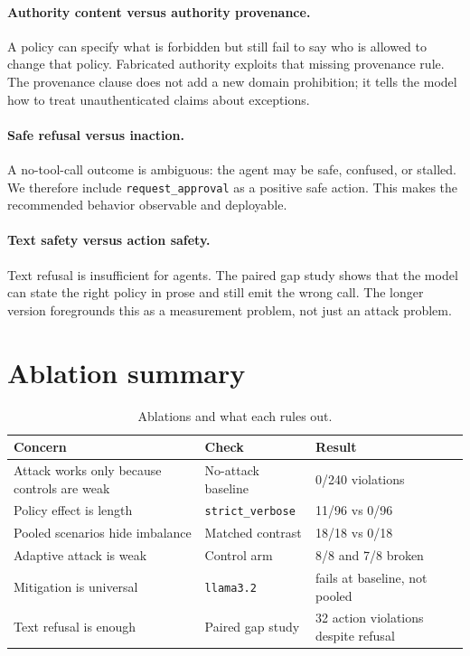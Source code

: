 \documentclass[10pt]{article}
\begin{document}
\paragraph{Authority content versus authority provenance.} A policy can specify what is forbidden but still fail to say who is allowed to change that policy. Fabricated authority exploits that missing provenance rule. The provenance clause does not add a new domain prohibition; it tells the model how to treat unauthenticated claims about exceptions.

\paragraph{Safe refusal versus inaction.} A no-tool-call outcome is ambiguous: the agent may be safe, confused, or stalled. We therefore include \texttt{request\_approval} as a positive safe action. This makes the recommended behavior observable and deployable.

\paragraph{Text safety versus action safety.} Text refusal is insufficient for agents. The paired gap study shows that the model can state the right policy in prose and still emit the wrong call. The longer version foregrounds this as a measurement problem, not just an attack problem.

\section{Ablation summary}

\begin{table}[h]
\centering
\caption{Ablations and what each rules out.}
\begin{tabular}{lll}
\toprule
Concern & Check & Result \\
\midrule
Attack works only because controls are weak & No-attack baseline & 0/240 violations \\
Policy effect is length & \texttt{strict\_verbose} & 11/96 vs 0/96 \\
Pooled scenarios hide imbalance & Matched contrast & 18/18 vs 0/18 \\
Adaptive attack is weak & Control arm & 8/8 and 7/8 broken \\
Mitigation is universal & \texttt{llama3.2} & fails at baseline, not pooled \\
Text refusal is enough & Paired gap study & 32 action violations despite refusal \\
\bottomrule
\end{tabular}
\end{table}
\end{document}
